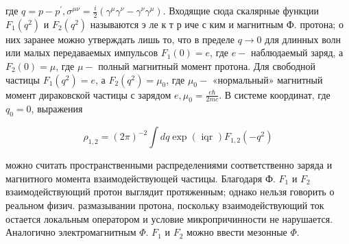 \documentclass[10pt]{article}
\begin{document}
где $q=p-p^{\prime}, \sigma^{\mu \nu}=\frac{i}{2}\left(\gamma^{\mu} \gamma^{\nu}-\gamma^{\nu} \gamma^{\mu}\right)$. Входящие сюда скалярные функции $F_{1}\left(q^{2}\right)$ и $F_{2}\left(q^{2}\right)$ называются э ле к т р иче с ким и магнитным Ф. протона; о них заранее можно утверждать лишь то, что в пределе $q \rightarrow 0$ для длинных волн или малых передаваемых импульсов $F_{1}(0)=e$, где $e-$ наблюдаемый заряд, а $F_{2}(0)=\mu$, где $\mu-$ полный магнитный момент протона. Для свободной частицы $F_{1}\left(q^{2}\right)=e$, а $F_{2}\left(q^{2}\right)=\mu_{0}$, где $\mu_{0}-$ «нормальный» магнитный момент дираковской частицы с зарядом $e, \mu_{0}=\frac{e \hbar}{2 m c}$. В системе координат, где $q_{0}=0$, выражения



\[

\rho_{1,2}=(2 \pi)^{-2} \int d q \exp (\text { iqr }) F_{1,2}\left(-q^{2}\right)

\]



можно считать пространственными распределениями соответственно заряда и магнитного момента взаимодействующей частицы. Благодаря Ф. $F_{1}$ и $F_{2}$ взаимодействующий протон выглядит протяженным; однако нельзя говорить о реальном физич. размазывании протона, поскольку взаимодействующий ток остается локальным оператором и условие микропричинности не нарушается. Аналогично электромагнитным $\Phi$. $F_{1}$ и $F_{2}$ можно ввести мезонные $\Phi$.
\end{document}
